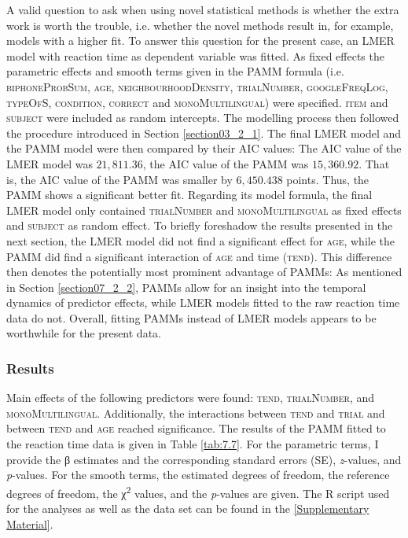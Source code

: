 A valid question to ask when using novel statistical methods is whether the extra work is worth the trouble, i.e. whether the novel methods result in, for example, models with a higher fit. To answer this question for the present case, an LMER model with reaction time as dependent variable was fitted. As fixed effects the parametric effects and smooth terms given in the PAMM formula (i.e. \textsc{biphoneProbSum, age, neighbourhoodDensity, trialNumber, googleFreqLog, typeOfS, condition, correct} and \textsc{monoMultilingual}) were specified. \textsc{item} and \textsc{subject} were included as random intercepts. The modelling process then followed the procedure introduced in Section \ref{section03_2_1}. The final LMER model and the PAMM model were then compared by their AIC values: The AIC value of the LMER model was $21,811.36$, the AIC value of the PAMM was $15,360.92$. That is, the AIC value of the PAMM was smaller by $6,450.438$ points. Thus, the PAMM shows a significant better fit. Regarding its model formula, the final LMER model only contained \textsc{trialNumber} and \textsc{monoMultilingual} as fixed effects and \textsc{subject} as random effect. To briefly foreshadow the results presented in the next section, the LMER model did not find a significant effect for \textsc{age}, while the PAMM did find a significant interaction of \textsc{age} and time (\textsc{tend}). This difference then denotes the potentially most prominent advantage of PAMMs: As mentioned in Section \ref{section07_2_2}, PAMMs allow for an insight into the temporal dynamics of predictor effects, while LMER models fitted to the raw reaction time data do not. Overall, fitting PAMMs instead of LMER models appears to be worthwhile for the present data.

\subsubsection{Results}\label{section07_2_2_3}

Main effects of the following predictors were found: \textsc{tend}, \textsc{trialNumber}, and \textsc{monoMultilingual}. Additionally, the interactions between \textsc{tend} and \textsc{trial} and between \textsc{tend} and \textsc{age} reached significance. The results of the PAMM fitted to the reaction time data is given in Table \ref{tab:7.7}. For the parametric terms, I provide the β estimates and the corresponding standard errors (SE), \textit{z}-values, and \textit{p}-values. For the smooth terms, the estimated degrees of freedom, the reference degrees of freedom, the χ\textsuperscript{2} values, and the \textit{p}-values are given. The R script used for the analyses as well as the data set can be found in the \ref{Supplementary Material}.

